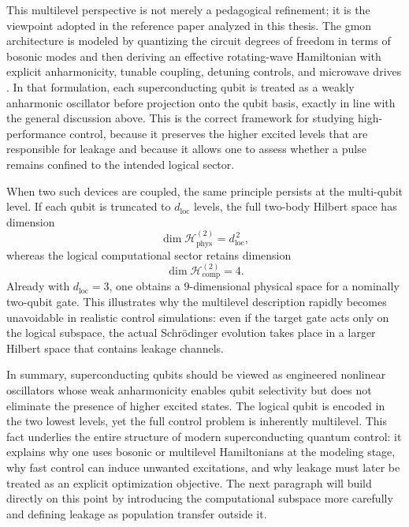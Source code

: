This multilevel perspective is not merely a pedagogical refinement; it is the viewpoint adopted in the reference paper analyzed in this thesis. The gmon architecture is modeled by quantizing the circuit degrees of freedom in terms of bosonic modes and then deriving an effective rotating-wave Hamiltonian with explicit anharmonicity, tunable coupling, detuning controls, and microwave drives \cite{Niu2019}. In that formulation, each superconducting qubit is treated as a weakly anharmonic oscillator before projection onto the qubit basis, exactly in line with the general discussion above. This is the correct framework for studying high-performance control, because it preserves the higher excited levels that are responsible for leakage and because it allows one to assess whether a pulse remains confined to the intended logical sector.

When two such devices are coupled, the same principle persists at the multi-qubit level. If each qubit is truncated to $d_{\mathrm{loc}}$ levels, the full two-body Hilbert space has dimension
\begin{equation}
\dim \mathcal{H}_{\mathrm{phys}}^{(2)}
=
d_{\mathrm{loc}}^{\,2},
\label{eq:two_qubit_physical_dimension}
\end{equation}
whereas the logical computational sector retains dimension
\begin{equation}
\dim \mathcal{H}_{\mathrm{comp}}^{(2)} = 4.
\label{eq:two_qubit_computational_dimension}
\end{equation}
Already with $d_{\mathrm{loc}}=3$, one obtains a $9$-dimensional physical space for a nominally two-qubit gate. This illustrates why the multilevel description rapidly becomes unavoidable in realistic control simulations: even if the target gate acts only on the logical subspace, the actual Schr\"odinger evolution takes place in a larger Hilbert space that contains leakage channels.

In summary, superconducting qubits should be viewed as engineered nonlinear oscillators whose weak anharmonicity enables qubit selectivity but does not eliminate the presence of higher excited states. The logical qubit is encoded in the two lowest levels, yet the full control problem is inherently multilevel. This fact underlies the entire structure of modern superconducting quantum control: it explains why one uses bosonic or multilevel Hamiltonians at the modeling stage, why fast control can induce unwanted excitations, and why leakage must later be treated as an explicit optimization objective. The next paragraph will build directly on this point by introducing the computational subspace more carefully and defining leakage as population transfer outside it.

